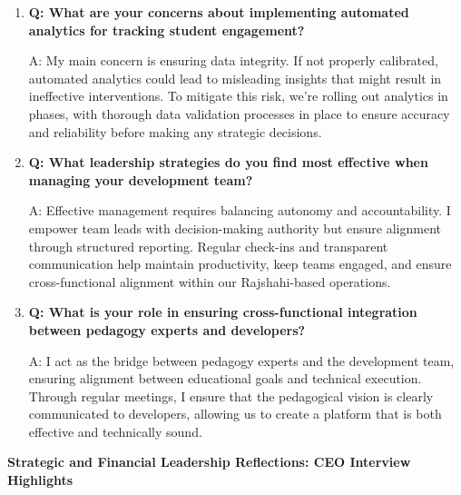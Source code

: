 \documentclass[12pt,a4paper,oneside]{book}
\begin{document}
\begin{enumerate}
\item \textbf{Q: What are your concerns about implementing automated analytics for tracking student engagement?}

A: My main concern is ensuring data integrity. If not properly calibrated, automated analytics could lead to misleading insights that might result in ineffective interventions. To mitigate this risk, we’re rolling out analytics in phases, with thorough data validation processes in place to ensure accuracy and reliability before making any strategic decisions.

\item \textbf{Q: What leadership strategies do you find most effective when managing your development team?}

A: Effective management requires balancing autonomy and accountability. I empower team leads with decision-making authority but ensure alignment through structured reporting. Regular check-ins and transparent communication help maintain productivity, keep teams engaged, and ensure cross-functional alignment within our Rajshahi-based operations.



\item \textbf{Q: What is your role in ensuring cross-functional integration between pedagogy experts and developers?}

A: I act as the bridge between pedagogy experts and the development team, ensuring alignment between educational goals and technical execution. Through regular meetings, I ensure that the pedagogical vision is clearly communicated to developers, allowing us to create a platform that is both effective and technically sound.




\end{enumerate}

  \textbf{Strategic and Financial Leadership Reflections: CEO Interview Highlights}
\end{document}
